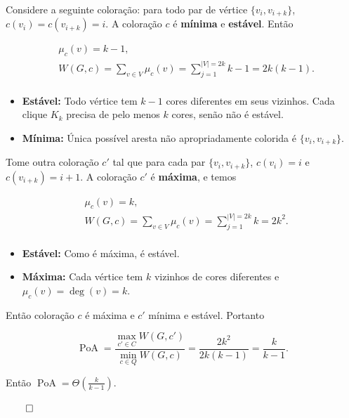 \documentclass{beamer}
\DeclareMathOperator*{\PoA}{\text{PoA}}
\theoremstyle{plain}
\begin{document}
\begin{frame}
  Considere a seguinte coloração: para todo par de vértice $\{v_i,v_{i+k}\}$,
  $c(v_i)=c(v_{i+k})=i$. A coloração $c$ é \textbf{mínima} e \textbf{estável}. Então

  \begin{align*}
    &\mu_c(v)=k-1,\\
    &W(G,c)=\sum_{v\in V}\mu_c(v)=\sum_{j=1}^{|V|=2k} k-1=2k(k-1).\\
  \end{align*}

  \begin{itemize}
    \item \textbf{Estável:} Todo vértice tem $k-1$ cores diferentes em seus vizinhos.
      Cada clique $K_k$ precisa de pelo menos $k$ cores, senão não é estável.
    \item \textbf{Mínima:} Única possível aresta não apropriadamente colorida é $\{v_i,v_{i+k}\}$.
  \end{itemize}

\end{frame}

\begin{frame}
  Tome outra coloração $c'$ tal que para cada par $\{v_i,v_{i+k}\}$, $c(v_i)=i$ e $c(v_{i+k})=i+1$.
  A coloração $c'$ é \textbf{máxima}, e temos

  \begin{align*}
    &\mu_c(v)=k,\\
    &W(G,c)=\sum_{v\in V}\mu_c(v)=\sum_{j=1}^{|V|=2k} k=2k^2.\\
  \end{align*}

  \begin{itemize}
    \item \textbf{Estável:} Como é máxima, é estável.
    \item \textbf{Máxima:} Cada vértice tem $k$ vizinhos de cores diferentes e
  $\mu_c(v)=\deg(v)=k$.
  \end{itemize}
\end{frame}

\begin{frame}
  Então coloração $c$ é máxima e $c'$ mínima e estável. Portanto

  \begin{equation*}
    \PoA=\frac{\max_{c'\in C}W(G,c')}{\min_{c\in Q}W(G,c)}=\frac{2k^2}{2k(k-1)}=\frac{k}{k-1}.
  \end{equation*}

  Então $\PoA=\Theta\left(\frac{k}{k-1}\right)$.

  \hfill$\qed$
\end{frame}
\end{document}
